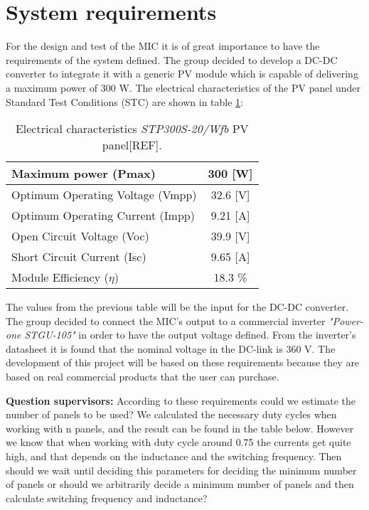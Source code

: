 \section{System requirements}

For the design and test of the MIC it is of great importance to have the requirements of the system defined. The group decided to develop a DC-DC converter to integrate it with a generic PV module which is capable of delivering a maximum power of 300 W. The electrical characteristics of the PV panel under Standard Test Conditions (STC) are shown in table \ref{el_charact_PV_panel}:

\begin{table}[H]
	\centering
	\begin{tabular}{ |l|c| } 
		\hline
		Maximum power (Pmax) & 300 [W]  \\ \hline
		Optimum Operating Voltage (Vmpp) & 32.6 [V]  \\ \hline
		Optimum Operating Current (Impp) & 9.21 [A]  \\ \hline
		Open Circuit Voltage (Voc) &  39.9 [V]\\ \hline
		Short Circuit Current (Isc) & 9.65 [A]  \\ \hline
		Module Efficiency ($\eta$) & 18.3 \%  \\ \hline
	\end{tabular}
	\caption{Electrical characteristics \textit{STP300S-20/Wfb} PV panel[REF].}
	\label{el_charact_PV_panel}
\end{table}

The values from the previous table will be the input for the DC-DC converter. The group decided to connect the MIC's output to a commercial inverter \textit{"Power-one STGU-105"} in order to have the output voltage defined. From the inverter's datasheet it is found that the nominal voltage in the DC-link is 360 V. 
The development of this project will be based on these requirements because they are based on real commercial products that the user can purchase. 

\textbf{Question supervisors:} According to these requirements could we estimate the number of panels to be used? We calculated the necessary duty cycles when working with n panels, and the result can be found in the table below. However we know that when working with duty cycle around 0.75 the currents get quite high, and that depends on the inductance and the switching frequency. Then should we wait until deciding this parameters for deciding the minimum number of panels or should we arbitrarily decide a minimum number of panels and then calculate switching frequency and inductance?

